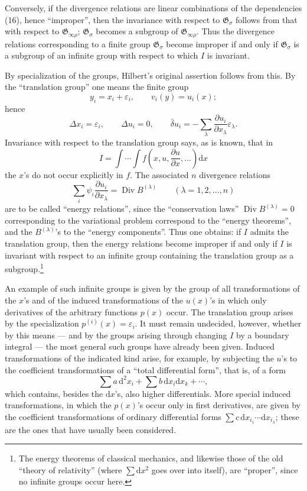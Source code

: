 \documentclass[11pt]{article}
\newcommand{\D}{\Delta}
\providecommand{\eps}{\varepsilon}
\providecommand{\dd}{\mathrm d}
\providecommand{\Div}{\operatorname{Div}}
\providecommand{\G}{\mathfrak G}
\providecommand{\bd}{\bar{\delta}}
\providecommand{\p}{\partial}
\providecommand{\p}{\partial}
\providecommand{\dd}{\mathrm d}
\begin{document}
Conversely, if the divergence relations are linear combinations of the dependencies (16), hence ``improper'', then the invariance with respect to \(\G_\sigma\) follows from that with respect to \(\G_{\infty\rho}\); \(\G_\sigma\) becomes a subgroup of \(\G_{\infty\rho}\). Thus the divergence relations corresponding to a finite group \(\G_\sigma\) become improper if and only if \(\G_\sigma\) is a subgroup of an infinite group with respect to which \(I\) is invariant.

By specialization of the groups, Hilbert's original assertion follows from this. By the ``translation group'' one means the finite group
\[
y_i=x_i+\eps_i,\qquad v_i(y)=u_i(x);
\]
hence
\[
\D x_i=\eps_i,\qquad \D u_i=0,\qquad
\bd u_i=-\sum_\lambda\frac{\p u_i}{\p x_\lambda}\eps_\lambda.
\]
Invariance with respect to the translation group says, as is known, that in
\[
I=\int\!\cdots\!\int f\!\left(x,u,\frac{\p u}{\p x},\ldots\right)\dd x
\]
the \(x\)'s do not occur explicitly in \(f\). The associated \(n\) divergence relations
\[
\sum_i\psi_i\frac{\p u_i}{\p x_\lambda}=\Div B^{(\lambda)}
\qquad(\lambda=1,2,\ldots,n)
\]
are to be called ``energy relations'', since the ``conservation laws'' \(\Div B^{(\lambda)}=0\) corresponding to the variational problem correspond to the ``energy theorems'', and the \(B^{(\lambda)}\)'s to the ``energy components''. Thus one obtains: if \(I\) admits the translation group, then the energy relations become improper if and only if \(I\) is invariant with respect to an infinite group containing the translation group as a subgroup.\footnote{The energy theorems of classical mechanics, and likewise those of the old ``theory of relativity'' (where \(\sum \dd x^2\) goes over into itself), are ``proper'', since no infinite groups occur here.}

An example of such infinite groups is given by the group of all transformations of the \(x\)'s and of the induced transformations of the \(u(x)\)'s in which only derivatives of the arbitrary functions \(p(x)\) occur. The translation group arises by the specialization \(p^{(i)}(x)=\eps_i\). It must remain undecided, however, whether by this means --- and by the groups arising through changing \(I\) by a boundary integral --- the most general such groups have already been given. Induced transformations of the indicated kind arise, for example, by subjecting the \(u\)'s to the coefficient transformations of a ``total differential form'', that is, of a form
\[
\sum a\,\dd^2x_i+\sum b\,\dd x_i\dd x_k+\cdots,
\]
which contains, besides the \(\dd x\)'s, also higher differentials. More special induced transformations, in which the \(p(x)\)'s occur only in first derivatives, are given by the coefficient transformations of ordinary differential forms \(\sum c\,\dd x_{i_1}\cdots \dd x_{i_\lambda}\); these are the ones that have usually been considered.
\end{document}
